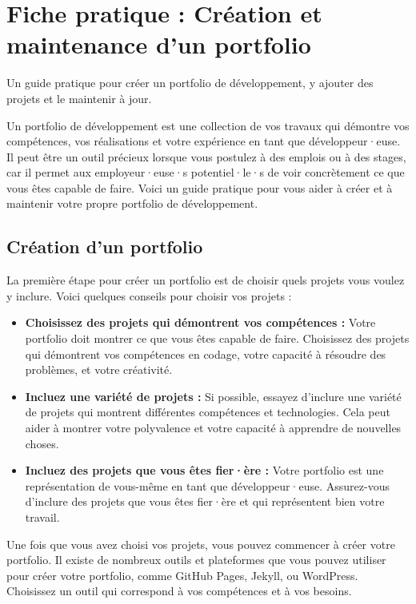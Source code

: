 \chapter{Fiche pratique : Création et maintenance d'un portfolio}
Un guide pratique pour créer un portfolio de développement, y ajouter des projets et le maintenir à jour.

Un portfolio de développement est une collection de vos travaux qui démontre vos compétences, vos réalisations et votre expérience en tant que développeur·euse. Il peut être un outil précieux lorsque vous postulez à des emplois ou à des stages, car il permet aux employeur·euse·s potentiel·le·s de voir concrètement ce que vous êtes capable de faire. Voici un guide pratique pour vous aider à créer et à maintenir votre propre portfolio de développement.

\section{Création d'un portfolio}

La première étape pour créer un portfolio est de choisir quels projets vous voulez y inclure. Voici quelques conseils pour choisir vos projets :

\begin{itemize}
    \item \textbf{Choisissez des projets qui démontrent vos compétences :} Votre portfolio doit montrer ce que vous êtes capable de faire. Choisissez des projets qui démontrent vos compétences en codage, votre capacité à résoudre des problèmes, et votre créativité.
    \item \textbf{Incluez une variété de projets :} Si possible, essayez d'inclure une variété de projets qui montrent différentes compétences et technologies. Cela peut aider à montrer votre polyvalence et votre capacité à apprendre de nouvelles choses.
    \item \textbf{Incluez des projets que vous êtes fier·ère :} Votre portfolio est une représentation de vous-même en tant que développeur·euse. Assurez-vous d'inclure des projets que vous êtes fier·ère et qui représentent bien votre travail.
\end{itemize}

Une fois que vous avez choisi vos projets, vous pouvez commencer à créer votre portfolio. Il existe de nombreux outils et plateformes que vous pouvez utiliser pour créer votre portfolio, comme GitHub Pages, Jekyll, ou WordPress. Choisissez un outil qui correspond à vos compétences et à vos besoins.

